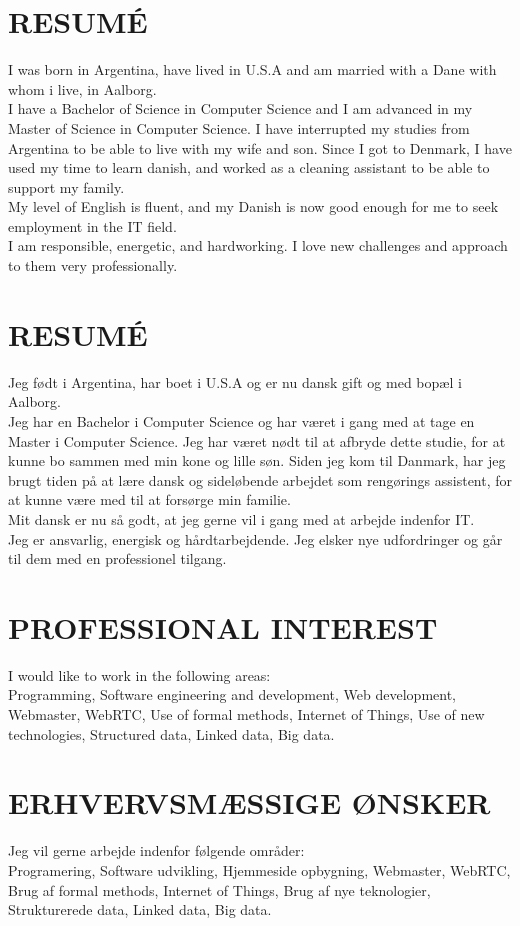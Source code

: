 \documentclass[11pt,a4paper,sans]{moderncv}        %
\makeatletter
\let\oldmakecvtitle\makecvtitle
\renewcommand*{\makecvtitle}{%
  {\centering\framebox{\texttt{[image: \\@photo]}}\par\vspace{10pt}}%
  \oldmakecvtitle%
}%
\makeatother
\begin{document}
\makecvtitle

\ifenglish
\section{RESUMÉ}
I was born in Argentina, have lived in U.S.A and am married with a Dane with whom i live, in Aalborg.\\
I have a Bachelor of Science in Computer Science and I am advanced in my Master of Science in Computer Science. I have interrupted my studies from Argentina to be able to live with my wife and son. Since I got to Denmark, I have used my time to learn danish, and worked as a cleaning assistant to be able to support my family.\\
My level of English is fluent, and my Danish is now good enough for me to seek employment in the IT field.\\
I am responsible, energetic, and hardworking. I love new challenges and approach to them very professionally.
\else
\section{RESUMÉ}
Jeg født i Argentina, har boet i U.S.A og er nu dansk gift og med bopæl i Aalborg.\\
Jeg har en Bachelor i Computer Science og har været i gang med at tage en Master i Computer Science. Jeg har været nødt til at afbryde dette studie, for at kunne bo sammen med min kone og lille søn. Siden jeg kom til Danmark, har jeg brugt tiden på at lære dansk og sideløbende arbejdet som rengørings assistent, for at kunne være med til at forsørge min familie.\\
Mit dansk er nu så godt, at jeg gerne vil i gang med at arbejde indenfor IT.\\
Jeg er ansvarlig, energisk og hårdtarbejdende. Jeg elsker nye udfordringer og går til dem med en professionel tilgang.
\fi

\ifenglish
\section{PROFESSIONAL INTEREST}
I would like to work in the following areas:\\
Programming, Software engineering and development, Web development, Webmaster, WebRTC, Use of formal methods, Internet of Things, Use of new technologies, Structured data, Linked data, Big data.
\else
\section{ERHVERVSMÆSSIGE ØNSKER}
Jeg vil gerne arbejde indenfor følgende områder:\\
Programering, Software udvikling, Hjemmeside opbygning, Webmaster, WebRTC, Brug af formal methods, Internet of Things, Brug af nye teknologier, Strukturerede data, Linked data, Big data.
\fi
\end{document}

